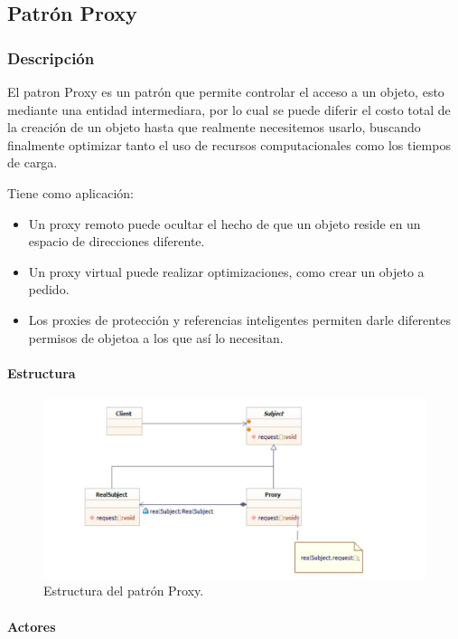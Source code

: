 \subsection{Patrón Proxy}

\subsubsection{Descripción}
El patron Proxy es un patrón que permite controlar el acceso a un objeto, esto  mediante una entidad intermediara, por lo cual se puede diferir el costo total de la creación de un objeto hasta que realmente necesitemos usarlo, buscando finalmente optimizar tanto el uso de recursos computacionales como los tiempos de carga.

Tiene como aplicación:

\begin{itemize}
	\item Un proxy remoto puede ocultar el hecho de que un objeto reside en un espacio de direcciones diferente.
	\item Un proxy virtual puede realizar optimizaciones, como crear un objeto a pedido.
	\item Los proxies de protección y referencias inteligentes permiten darle diferentes permisos de objetoa a los que así lo necesitan.
\end{itemize}

\paragraph{Estructura}

\begin{figure}[th!]
	\centering
	\includegraphics[width=.7\linewidth]{imagenes/Patrones/estructura_Proxy.pdf}
	\caption{Estructura del patrón Proxy.\cite{gof}}	
\end{figure}

\paragraph{Actores}


